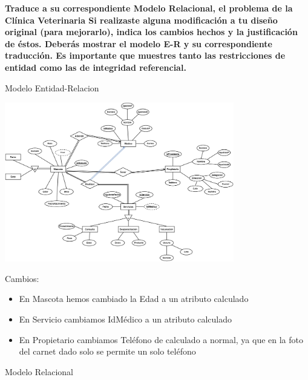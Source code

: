\textbf{Traduce a su correspondiente Modelo Relacional, el problema de la Clínica Veterinaria Si realizaste alguna modificación a tu diseño original (para mejorarlo), indica los cambios hechos y la justificación de éstos. Deberás mostrar el modelo E-R y su correspondiente traducción. Es importante que muestres tanto las restricciones de entidad como las de integridad referencial.}\vspace{.3cm}

Modelo Entidad-Relacion

\begin{center}
\includegraphics[width=10cm]{resources/Ejercicio3b.png}
\end{center}
Cambios:
\begin{itemize}
    \item En Mascota hemos cambiado la Edad a un atributo calculado
    \item En Servicio cambiamos IdMédico a un atributo calculado
    \item En Propietario cambiamos Teléfono de calculado a normal, ya que en la foto del carnet dado solo se permite un solo teléfono
\end{itemize}

Modelo Relacional

